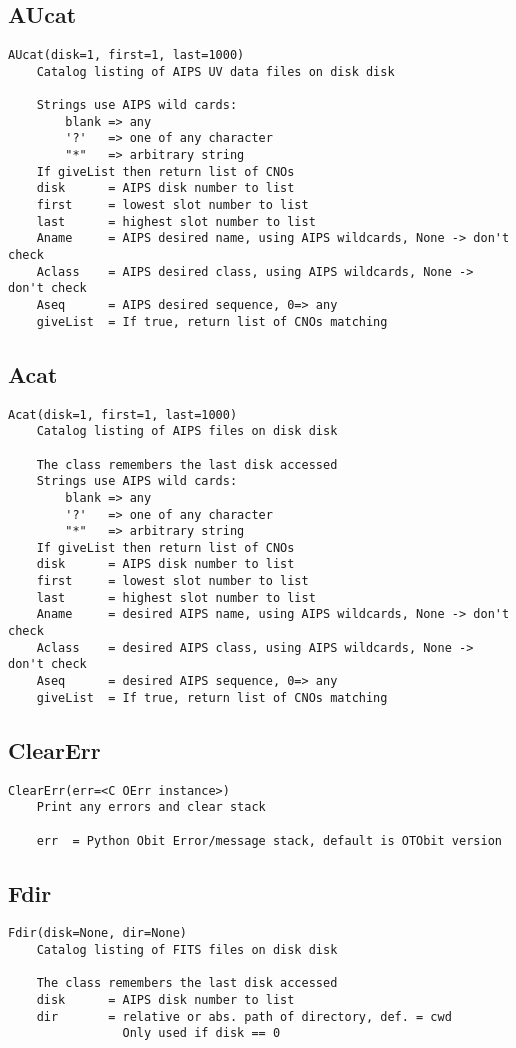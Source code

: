\documentclass[11pt]{report}
\begin{document}
\subsection{AUcat}
\begin{verbatim}
AUcat(disk=1, first=1, last=1000)
    Catalog listing of AIPS UV data files on disk disk
    
    Strings use AIPS wild cards:
        blank => any
        '?'   => one of any character
        "*"   => arbitrary string
    If giveList then return list of CNOs
    disk      = AIPS disk number to list
    first     = lowest slot number to list
    last      = highest slot number to list
    Aname     = AIPS desired name, using AIPS wildcards, None -> don't check
    Aclass    = AIPS desired class, using AIPS wildcards, None -> don't check
    Aseq      = AIPS desired sequence, 0=> any
    giveList  = If true, return list of CNOs matching
\end{verbatim}

\subsection{Acat}
\begin{verbatim}
Acat(disk=1, first=1, last=1000)
    Catalog listing of AIPS files on disk disk
    
    The class remembers the last disk accessed
    Strings use AIPS wild cards:
        blank => any
        '?'   => one of any character
        "*"   => arbitrary string
    If giveList then return list of CNOs
    disk      = AIPS disk number to list
    first     = lowest slot number to list
    last      = highest slot number to list
    Aname     = desired AIPS name, using AIPS wildcards, None -> don't check
    Aclass    = desired AIPS class, using AIPS wildcards, None -> don't check
    Aseq      = desired AIPS sequence, 0=> any
    giveList  = If true, return list of CNOs matching
\end{verbatim}

\subsection{ClearErr}
\begin{verbatim}
ClearErr(err=<C OErr instance>)
    Print any errors and clear stack
    
    err  = Python Obit Error/message stack, default is OTObit version
\end{verbatim}

\subsection{Fdir}
\begin{verbatim}
Fdir(disk=None, dir=None)
    Catalog listing of FITS files on disk disk
    
    The class remembers the last disk accessed
    disk      = AIPS disk number to list
    dir       = relative or abs. path of directory, def. = cwd
                Only used if disk == 0
\end{verbatim}
\end{document}
